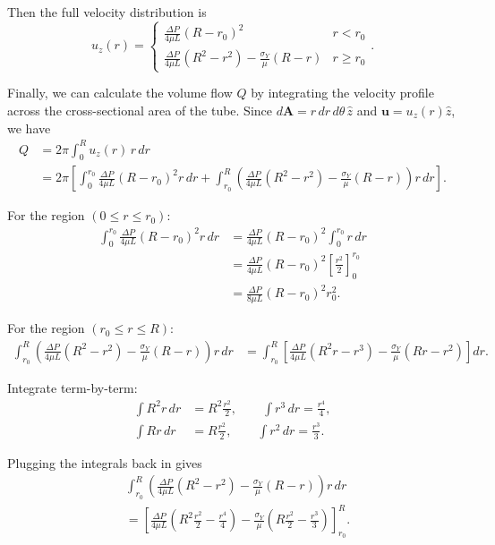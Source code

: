 Then the full velocity distribution is
\[
	\boxed{u_z(r) = \begin{cases}
		\frac{\Delta P}{4\mu L}(R - r_0)^2 & r < r_0 \\
		\frac{\Delta P}{4\mu L}(R^2 - r^2) - \frac{\sigma_Y}{\mu}(R - r) & r \geq r_0
	\end{cases}}.
\]

Finally, we can calculate the volume flow $Q$ by integrating the velocity profile across the cross-sectional area of the tube. Since $d\mathbf{A} = r\,dr\,d\theta\,\hat{z}$ and $\mathbf{u} = u_z(r)\hat{z}$, we have
\begin{align*}
Q
&= 2\pi \int_0^R u_z(r)\, r\,dr \\
&= 2\pi \left[
\int_0^{r_0} \frac{\Delta P}{4\mu L}(R - r_0)^2 r\,dr
+ \int_{r_0}^R \left(\frac{\Delta P}{4\mu L}(R^2 - r^2) - \frac{\sigma_Y}{\mu}(R - r)\right) r\,dr
\right].
\end{align*}

For the region $(0 \le r \le r_0)$:
\begin{align*}
\int_0^{r_0} \frac{\Delta P}{4\mu L}(R - r_0)^2 r\,dr
&= \frac{\Delta P}{4\mu L}(R - r_0)^2 \int_0^{r_0} r\,dr \\
&= \frac{\Delta P}{4\mu L}(R - r_0)^2 \left[\frac{r^2}{2}\right]_0^{r_0} \\
&= \frac{\Delta P}{8\mu L}(R - r_0)^2 r_0^2.
\end{align*}

For the region $(r_0 \le r \le R)$:
\begin{align*}
\int_{r_0}^R \left(\frac{\Delta P}{4\mu L}(R^2 - r^2) - \frac{\sigma_Y}{\mu}(R - r)\right) r\,dr
&= \int_{r_0}^R
\left[
\frac{\Delta P}{4\mu L}(R^2 r - r^3)
- \frac{\sigma_Y}{\mu}(Rr - r^2)
\right]dr.
\end{align*}

Integrate term-by-term:
\begin{align*}
\int R^2 r\,dr &= R^2\frac{r^2}{2}, \qquad
\int r^3\,dr = \frac{r^4}{4}, \\
\int Rr\,dr &= R\frac{r^2}{2}, \qquad
\int r^2\,dr = \frac{r^3}{3}.
\end{align*}

Plugging the integrals back in gives
\begin{align*}
&\int_{r_0}^R \left(\frac{\Delta P}{4\mu L}(R^2 - r^2) - \frac{\sigma_Y}{\mu}(R - r)\right) r\,dr \\
&=
\left[
\frac{\Delta P}{4\mu L}\left(R^2\frac{r^2}{2} - \frac{r^4}{4}\right)
- \frac{\sigma_Y}{\mu}\left(R\frac{r^2}{2} - \frac{r^3}{3}\right)
\right]_{r_0}^{R}.
\end{align*}

